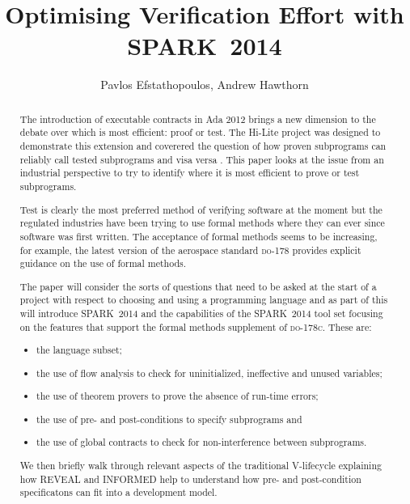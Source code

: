 \documentclass{llncs}
\newcommand{\DO}{\textsc{do-178}\xspace}
\newcommand{\DOC}{\textsc{do-178c}\xspace}
\newcommand{\newspark}{SPARK~2014\xspace}
\begin{document}
\title{Optimising Verification Effort with \newspark}

\author{Pavlos Efstathopoulos, Andrew Hawthorn}

\maketitle

\begin{abstract}
The introduction of executable contracts in Ada 2012 brings a new
dimension to the debate over which is most efficient: proof or
test. The Hi-Lite project was designed to demonstrate this extension
and coverered the question of how proven subprograms can reliably call
tested subprograms and visa versa \cite{hiliteERTS2012}. This paper
looks at the issue from an industrial perspective to try to identify
where it is most efficient to prove or test subprograms.

Test is clearly the most preferred method of verifying software at the
moment but the regulated industries have been trying to use formal
methods where they can ever since software was first written. The
acceptance of formal methods seems to be increasing, for example, the
latest version of the aerospace standard \DO provides explicit
guidance on the use of formal methods.

The paper will consider the sorts of questions that need to be
asked at the start of a project with respect to choosing and using a
programming language and as part of this will introduce \newspark and the
capabilities of the \newspark tool set focusing on the features that
support the formal methods supplement of \DOC. These are:
\begin{itemize}
   \item the language subset;
   \item the use of flow analysis to check for uninitialized, ineffective
         and unused variables;
   \item the use of theorem provers to prove the absence of run-time errors;
   \item the use of pre- and post-conditions to specify subprograms and
   \item the use of global contracts to check for non-interference between 
         subprograms.
\end{itemize}

We then briefly walk through relevant aspects of the traditional 
V-lifecycle explaining how REVEAL \cite{reveal} and INFORMED 
\cite{informed} help to understand how pre- and post-condition
specificatons can fit into a development model.


\end{abstract}
\end{document}
